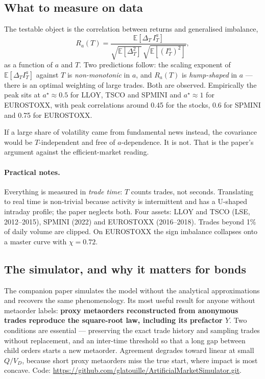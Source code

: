 \documentclass[11pt]{article}
\newcommand{\E}{\mathbb{E}}
\begin{document}
\subsection{What to measure on data}

The testable object is the correlation between returns and generalised
imbalance,
\begin{equation}
R_a(T)=\frac{\E[\Delta_T\,I^a_T]}{\sqrt{\E[\Delta_T^2]}\,\sqrt{\E[(I^a_T)^2]}},
\end{equation}
as a function of $a$ and $T$. Two predictions follow: the scaling exponent of
$\E[\Delta_T I^a_T]$ against $T$ is \emph{non-monotonic} in $a$, and $R_a(T)$ is
\emph{hump-shaped} in $a$ --- there is an optimal weighting of large trades.
Both are observed. Empirically the peak sits at $a^\star\approx0.5$ for LLOY,
TSCO and SPMINI and $a^\star\approx1$ for EUROSTOXX, with peak correlations
around 0.45 for the stocks, 0.6 for SPMINI and 0.75 for EUROSTOXX.

If a large share of volatility came from fundamental news instead, the
covariance would be $T$-independent and free of $a$-dependence. It is not. That
is the paper's argument against the efficient-market reading.

\paragraph{Practical notes.} Everything is measured in \emph{trade time}: $T$
counts trades, not seconds. Translating to real time is non-trivial because
activity is intermittent and has a U-shaped intraday profile; the paper
neglects both. Four assets: LLOY and TSCO (LSE, 2012--2015), SPMINI (2022) and
EUROSTOXX (2016--2018). Trades beyond 1\% of daily volume are clipped. On EUROSTOXX the
sign imbalance collapses onto a master curve with $\chi=0.72$.

\subsection{The simulator, and why it matters for bonds}

The companion paper simulates the model without the analytical approximations
and recovers the same phenomenology. Its most useful result for anyone without
metaorder labels: \textbf{proxy metaorders reconstructed from anonymous trades
reproduce the square-root law, including its prefactor $Y$}. Two conditions are
essential --- preserving the exact trade history and sampling trades without
replacement, and an inter-time threshold so that a long gap between child
orders starts a new metaorder. Agreement degrades toward linear at small
$Q/V_D$, because short proxy metaorders miss the true start, where impact is
most concave. Code: \url{https://github.com/glatouille/ArtificialMarketSimulator.git}.
\end{document}
